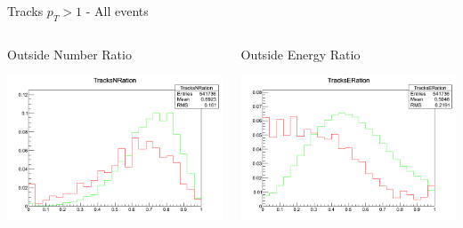 \documentclass[8pt]{beamer}
\begin{document}
\begin{frame}{Tracks $p_T>1$ - All events}

\begin{columns}
 
\begin{block}{Outside Number Ratio}
 
\includegraphics[width=\linewidth]{img/Tracks1_TracksNRatio.png}

\end{block}

\begin{block}{Outside Energy Ratio}
 
\includegraphics[width=\linewidth]{img/Tracks1_TracksERatio.png}
 
\end{block}

\end{columns}

\end{frame}
\end{document}
